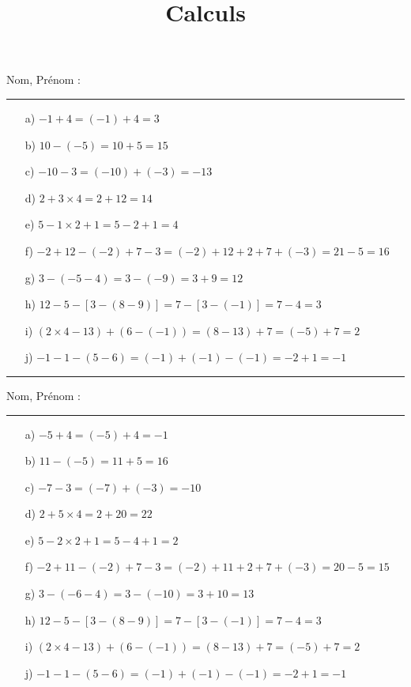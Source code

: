 \documentclass[14pt]{extreport}
\title{Calculs}
\date{}
\theoremstyle{plain}
\begin{document}
Nom, Prénom : \rule{5 cm}{0.4pt}
\begin{enumerate}
\item[a)] $ -1 + 4 = (-1)+4 = 3$
\item[b)] $ 10 - (- 5) = 10 + 5 = 15$
\item[c)] $ - 10 - 3 = (-10) + (-3) = -13$
\item[d)] $ 2 + 3\times 4 = 2  + 12 = 14$
\item[e)] $ 5- 1 \times 2 +1 = 5 - 2 + 1 = 4$

\item[f)] $ -2 + 12 - (-2) + 7 - 3 = (-2) + 12 + 2 + 7 + (-3) = 21 - 5 = 16$
\item[g)] $ 3  - (-5 - 4) = 3 - (-9) = 3 + 9 = 12$
\item[h)] $ 12 - 5 - [3 - (8-9)]  = 7 - [3 - (-1)] = 7 - 4 = 3$
\item[i)] $ 	(2 \times 4- 13) + (6-  (-1)) = (8-13)+ 7 = (-5) +7=2$
\item[j)] $ - 1 - 1 - (5 - 6) = (-1) + (-1) - (-1) = -2 + 1 = -1$
\end{enumerate}
 


\par\noindent\rule{\textwidth}{0.4pt}

Nom, Prénom : \rule{5 cm}{0.4pt}
 
\begin{enumerate}
\item[a)] $ -5 + 4= (-5) + 4 = -1$
\item[b)] $ 11 - (- 5) = 11 + 5 = 16$
\item[c)] $ - 7 - 3 = (-7) + (-3) = -10$
\item[d)] $ 2 + 5\times 4 = 2 + 20 = 22$
\item[e)] $ 5- 2 \times 2 +1 = 5 - 4 + 1 = 2$

\item[f)] $ -2 + 11 - (-2) + 7 - 3 = (-2) + 11 + 2 + 7 + (-3) = 20 -5 = 15$
\item[g)] $ 3  - (-6 - 4) = 3 - (-10) = 3 + 10 = 13$
\item[h)] $ 12 - 5 - [3 - (8-9)] = 7 - [3 - (-1)] = 7 - 4 = 3$
\item[i)] $ 	(2 \times 4- 13) + (6-  (-1))= (8-13)+ 7 = (-5) +7=2$
\item[j)] $ - 1 - 1 - (5 - 6)= (-1) + (-1) - (-1) = -2 + 1 = -1$
\end{enumerate}
 
 
\end{document}

